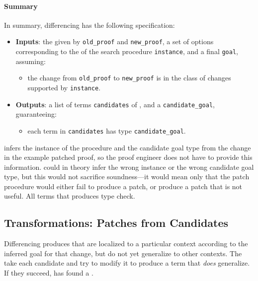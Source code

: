 \paragraph{Summary}
In summary, differencing has the following specification:

\begin{itemize}
\item \textbf{Inputs}: the  given by \lstinline{old_proof} and \lstinline{new_proof}, a set of options corresponding to the  of the search procedure \lstinline{instance}, and a final  \lstinline{goal}, assuming:
\begin{itemize}
\item the change from \lstinline{old_proof} to \lstinline{new_proof} is in the class of changes supported by \lstinline{instance}.
\end{itemize}
\item \textbf{Outputs}: a list of terms \lstinline{candidates} of , and a   \lstinline{candidate_goal}, guaranteeing:
\begin{itemize}
\item each term in \lstinline{candidates} has type \lstinline{candidate_goal}.
\end{itemize}
\end{itemize}
\sysname infers the instance of the procedure and the candidate goal type from the change in the example patched proof, so the proof engineer does not have to provide this information.
\sysname could in theory infer the wrong instance or the wrong candidate goal type, but this would not sacrifice soundness---it would mean only that
the patch procedure would either fail to produce a patch, or produce a patch that is not useful.
All terms that \sysname produces type check. %

\subsection{Transformations: Patches from Candidates}
\label{sec:pumpkin-spec-trans}

Differencing produces  that are localized to a particular context according to the inferred goal for that change,
but do not yet generalize to other contexts.
The  take each candidate and try to modify it to produce a term that \textit{does} generalize.
If they succeed, \sysname has found a .

